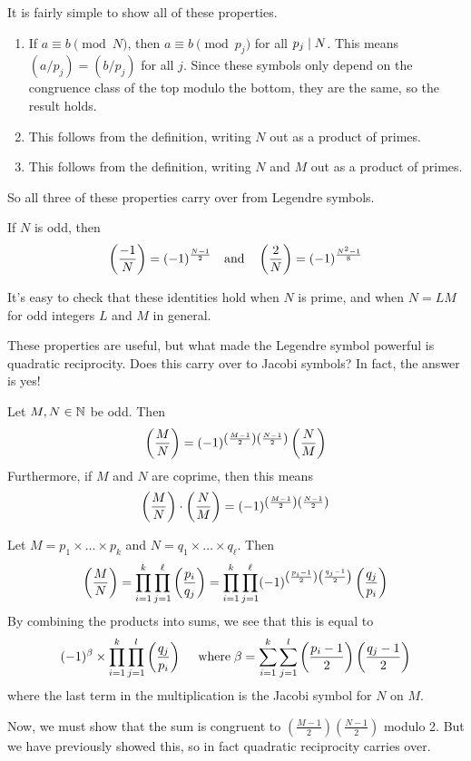 \documentclass{article}
\begin{document}
\begin{prf}
	It is fairly simple to show all of these properties.
    \begin{enumerate}
	    \item If $a \equiv b \pmod{N}$, then $a \equiv b \pmod{p_j}$ for all $p_j \mid N$. This means $(a/p_j) = (b/p_j)$ for all $j$. Since these symbols only depend on the congruence class of the top modulo the bottom, they are the same, so the result holds.
	    \item This follows from the definition, writing $N$ out as a product of primes.
	    \item This follows from the definition, writing $N$ and $M$ out as a product of primes.
	\end{enumerate}
	So all three of these properties carry over from Legendre symbols.
\end{prf}

\begin{proposition}
    If $N$ is odd, then
    \[
	\left( \frac{-1}{N} \right) = (-1)^{\frac{N-1}{2}} \quad \text{and} \quad \left( \frac{2}{N} \right) = (-1)^{\frac{N^2-1}{8}}
	\]
\end{proposition}

\begin{prf}
    It's easy to check that these identities hold when $N$ is prime, and when $N = LM$ for odd integers $L$ and $M$ in general.
\end{prf}

These properties are useful, but what made the Legendre symbol powerful is quadratic reciprocity. Does this carry over to Jacobi symbols? In fact, the answer is yes!

\begin{theorem}
	\label{quadratic-reciprocity-jacobi}
    Let $M, N \in \mathbb{N}$ be odd. Then
    \[
	\left( \frac{M}{N} \right) = (-1)^{\left( \frac{M-1}{2} \right) \left( \frac{N-1}{2} \right)} \left( \frac{N}{M} \right)
	\]
	Furthermore, if $M$ and $N$ are coprime, then this means
	\[
	\left( \frac{M}{N} \right) \cdot \left( \frac{N}{M} \right) = (-1)^{\left( \frac{M-1}{2} \right) \left( \frac{N-1}{2} \right)}
	\]
\end{theorem}

\begin{prf}
	Let $M = p_1 \times \dots \times p_k$ and $N = q_1 \times \dots \times q_\ell$. Then
	\[
	\left( \frac{M}{N} \right) =
	\prod_{i=1}^k \prod_{j=1}^\ell \left( \frac{p_i}{q_j} \right) =
	\prod_{i=1}^k \prod_{j=1}^\ell
	(-1)^{\left( \frac{p_i-1}{2} \right) \left( \frac{q_j - 1}{2} \right)}
	\left( \frac{q_j}{p_i} \right)
	\]
	By combining the products into sums, we see that this is equal to
	\[
	(-1)^\beta \times
	\prod_{i=1}^k \prod_{j=1}^l
	\left( \frac{q_j}{p_i} \right)
	\quad \mathrel{\, \text{where}}
	\beta = \sum_{i=1}^k \sum_{j=1}^l
	\left( \frac{p_i-1}{2} \right) \left( \frac{q_j - 1}{2} \right)
	\]
	where the last term in the multiplication is the Jacobi symbol for $N$ on $M$.
	
	Now, we must show that the sum is congruent to $\left( \frac{M-1}{2} \right) \left( \frac{N - 1}{2} \right)$ modulo 2. But we have previously showed this, so in fact quadratic reciprocity carries over.
\end{prf}
\end{document}
